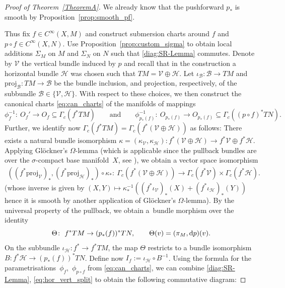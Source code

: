 \documentclass[11pt]{article}
\numberwithin{equation}{section}
\numberwithin{equation}{section}
\newcommand{\cB}{\ensuremath{\mathcal{B}}}
\newcommand{\cH}{\ensuremath{\mathcal{H}}}
\newcommand{\cV}{\ensuremath{\mathcal{V}}}
\begin{document}
\begin{proof}[Proof of Theorem~\ref{TheoremA}]
We already know that the pushforward $p_\ast$ is smooth by Proposition~\ref{prop:smooth_pf}.

Thus fix $f \in C^\infty (X,M)$ and construct submersion charts around $f$ and $p\circ f \in C^\infty (X,N)$. Use Proposition~\ref{prop:custom_sigma} to obtain local additions $\Sigma_M$ on $M$ and $\Sigma_N$ on $N$ such that \eqref{diag:SR-Lemma} commutes. Denote by $\cV$ the vertical bundle induced by $p$ and recall that in the construction a horizontal bundle $\cH$ was chosen such that $TM = \mathcal{V} \oplus \mathcal{H}$. Let $\iota_\cB \colon \cB \rightarrow TM$ and $\text{proj}_{\cB} \colon TM \rightarrow \cB$ be the bundle inclusion, and projection, respectively, of the subbundle $\cB \in \{\cV, \cH\}$.
With respect to these choices, we then construct the canonical charts \eqref{eq:can_charts} of the manifolds of mappings
\begin{displaymath}
 \phi_f^{-1} \colon\ O_f' \rightarrow O_f \subseteq \Gamma_c (f^{\ast}TM) \qquad\text{and}\qquad \phi_{p_\ast (f)}^{-1}\colon\ O_{p_\ast (f)} \rightarrow O_{p_\ast (f)}\subseteq \Gamma_c ((p\circ f)^\ast TN).
\end{displaymath}
Further, we identify now $\Gamma_c (f^\ast TM)=\Gamma_c (f^\ast (\cV\oplus \cH))$ as follows: There exists a natural bundle isomorphism $\kappa =(\kappa_\cV, \kappa_\cH) \colon f^\ast (\cV \oplus \cH) \rightarrow f^\ast \cV \oplus f^\ast \cH$. Applying Gl\"{o}ckner's $\Omega$-lemma \mbox{\cite[Theorem~F.23]{glo04}} (which is applicable since the pullback bundles are over the $\sigma$-compact base manifold~$X$, see \cite[Lemma F.19\,(c)]{glo04}), we obtain a vector space isomorphism
\begin{align}\label{eq:hor_vert_split}
((f^\ast \text{proj}_\cV)_\ast, (f^\ast \text{proj}_\cH)_\ast) \circ \kappa_\ast \colon\ \Gamma_c (f^\ast (\cV\oplus \cH))\rightarrow \Gamma_c(f^\ast \cV)\times \Gamma_c(f^\ast \cH).
\end{align}
(whose inverse is given by $ (X,Y) \mapsto \kappa^{-1}_\ast ((f^\ast \iota_\cV)_\ast (X) + (f^\ast \iota_{\cH})_\ast (Y))$ hence it is smooth by another application of Gl\"{o}ckner's $\Omega$-lemma).
By the universal property of the pullback, we obtain a~bundle morphism over the identity
\begin{displaymath}
 \Theta \colon\ f^\ast TM \rightarrow (p_\ast(f))^\ast TN,\qquad \Theta (v)=(\pi_M,{\rm d}p)(v).
\end{displaymath}
On the subbundle $\iota_{\cH}\colon f^\ast \rightarrow f^\ast TM$, the map $\Theta$ restricts to a bundle isomorphism $B\colon f^\ast \cH \rightarrow (p_\ast (f))^\ast TN$. Define now $I_f := \iota_{\cH} \circ B^{-1}$. Using the formula for the parametrisations~$\phi_f$,~$\phi_{p\circ f}$ from \eqref{eq:can_charts}, we can combine \eqref{diag:SR-Lemma}, \eqref{eq:hor_vert_split} to obtain the following commutative diagram:

\end{proof}
\end{document}
